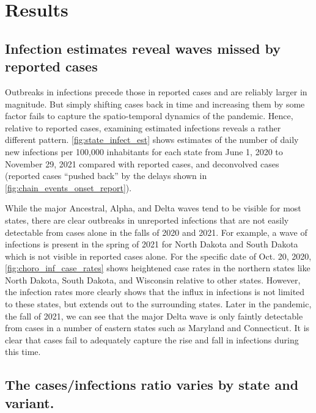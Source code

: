 \section{Results}
\label{sec:results}


\subsection{Infection estimates reveal waves missed by reported cases}
\label{sec:omitted-waves}

Outbreaks in infections precede those in reported cases and are reliably larger
in magnitude. But simply shifting cases back in time and increasing them by some
factor fails to capture the spatio-temporal dynamics of the pandemic. 
Hence, relative to reported cases, examining estimated infections reveals a
rather different pattern. \autoref{fig:state_infect_est} shows
estimates of the number of daily new infections per 100,000 inhabitants for each
\US state from June 1, 2020 to November 29, 2021 compared with reported cases,
and deconvolved cases (reported cases ``pushed back'' by the delays shown in
\autoref{fig:chain_events_onset_report}). 

While the major Ancestral, Alpha, and Delta waves tend to be visible for most
states, there are clear outbreaks in unreported infections that are not easily
detectable from cases alone in the falls of 2020 and 2021. For example, a wave
of infections is present in the spring of 2021 for North Dakota and South Dakota
which is not visible in reported cases alone. For the specific date of Oct. 20,
2020, \autoref{fig:choro_inf_case_rates} shows heightened case rates in the
northern states like North Dakota, South Dakota, and Wisconsin relative to other
states. However, the infection rates more clearly shows that the influx in
infections is not limited to these states, but extends out to the surrounding
states. Later in the pandemic, the fall of 2021, we can see that the major Delta
wave is only faintly detectable from cases in a number of eastern states such as
Maryland and Connecticut. It is clear that cases fail to adequately capture the
rise and fall in infections during this time.

\subsection{The cases/infections ratio varies by state and variant.}
\label{sec:case-infection-ratio}


